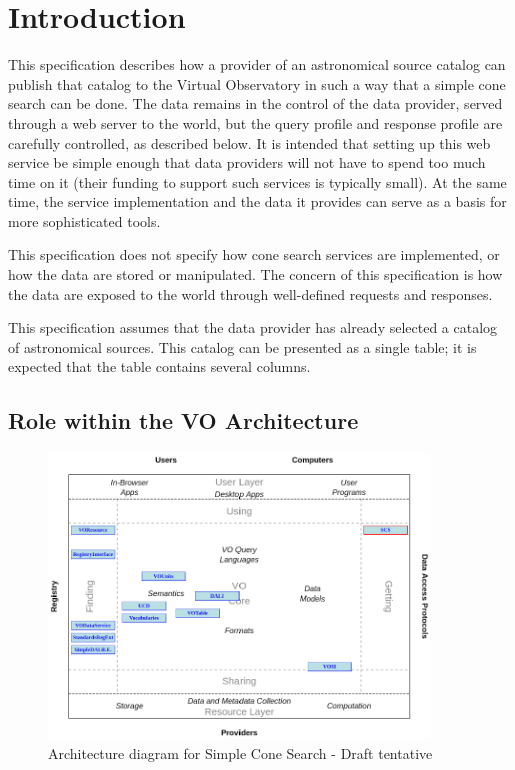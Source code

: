 \documentclass[11pt,a4paper]{ivoa}
\begin{document}
\section{Introduction}

This specification describes how a provider of an astronomical source
catalog can publish that catalog to the Virtual Observatory in such a
way that a simple cone search can be done. The data remains in the
control of the data provider, served through a web server to the world,
but the query profile and response profile are carefully controlled, as
described below. It is intended that setting up this web service be
simple enough that data providers will not have to spend too much time
on it (their funding to support such services is typically small). At
the same time, the service implementation and the data it provides can
serve as a basis for more sophisticated tools.

This specification does not specify how cone search services are
implemented, or how the data are stored or manipulated. The concern of
this specification is how the data are exposed to the world through
well-defined requests and responses.

This specification assumes that the data provider has already selected a
catalog of astronomical sources. This catalog can be presented as a
single table; it is expected that the table contains several columns.

\subsection{Role within the VO Architecture}

\begin{figure}
\centering


\includegraphics[width=0.9\textwidth]{role_diagram.pdf}
\caption{Architecture diagram for Simple Cone Search - Draft tentative}
\label{fig:archdiag}
\end{figure}
\end{document}
